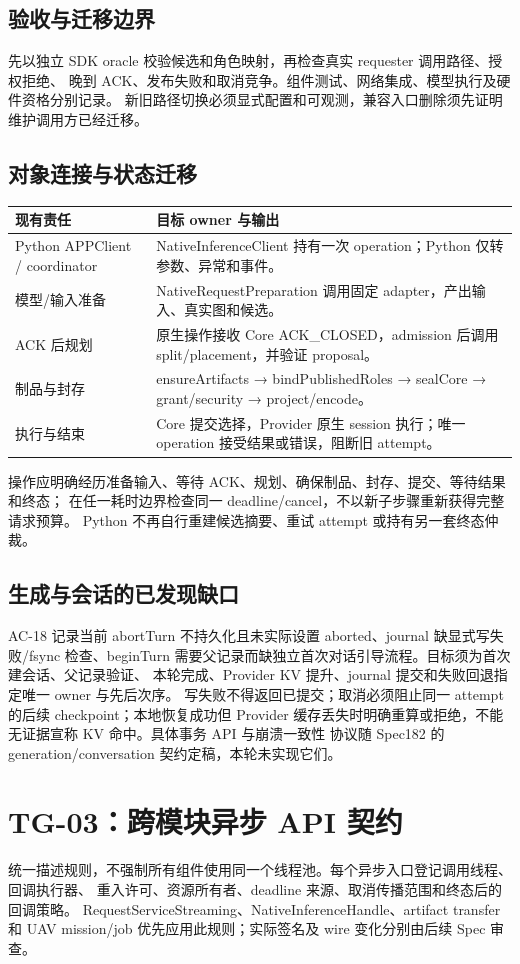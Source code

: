 \subsection{验收与迁移边界}
先以独立 SDK oracle 校验候选和角色映射，再检查真实 requester 调用路径、授权拒绝、
晚到 ACK、发布失败和取消竞争。组件测试、网络集成、模型执行及硬件资格分别记录。
新旧路径切换必须显式配置和可观测，兼容入口删除须先证明维护调用方已经迁移。

\subsection{对象连接与状态迁移}
\begin{tabularx}{\linewidth}{@{}p{45mm}X@{}}
\toprule
现有责任 & 目标 owner 与输出 \\
\midrule
Python APPClient / coordinator & NativeInferenceClient 持有一次 operation；Python 仅转参数、异常和事件。\\
模型/输入准备 & NativeRequestPreparation 调用固定 adapter，产出输入、真实图和候选。\\
ACK 后规划 & 原生操作接收 Core ACK\_CLOSED，admission 后调用 split/placement，并验证 proposal。\\
制品与封存 & ensureArtifacts → bindPublishedRoles → sealCore → grant/security → project/encode。\\
执行与结束 & Core 提交选择，Provider 原生 session 执行；唯一 operation 接受结果或错误，阻断旧 attempt。\\
\bottomrule
\end{tabularx}
操作应明确经历准备输入、等待 ACK、规划、确保制品、封存、提交、等待结果和终态；
在任一耗时边界检查同一 deadline/cancel，不以新子步骤重新获得完整请求预算。
Python 不再自行重建候选摘要、重试 attempt 或持有另一套终态仲裁。

\subsection{生成与会话的已发现缺口}
AC-18 记录当前 abortTurn 不持久化且未实际设置 aborted、journal 缺显式写失败/fsync
检查、beginTurn 需要父记录而缺独立首次对话引导流程。目标须为首次建会话、父记录验证、
本轮完成、Provider KV 提升、journal 提交和失败回退指定唯一 owner 与先后次序。
写失败不得返回已提交；取消必须阻止同一 attempt 的后续 checkpoint；本地恢复成功但
Provider 缓存丢失时明确重算或拒绝，不能无证据宣称 KV 命中。具体事务 API 与崩溃一致性
协议随 Spec182 的 generation/conversation 契约定稿，本轮未实现它们。

\section{TG-03：跨模块异步 API 契约}
统一描述规则，不强制所有组件使用同一个线程池。每个异步入口登记调用线程、回调执行器、
重入许可、资源所有者、deadline 来源、取消传播范围和终态后的回调策略。
RequestServiceStreaming、NativeInferenceHandle、artifact transfer 和 UAV mission/job
优先应用此规则；实际签名及 wire 变化分别由后续 Spec 审查。

